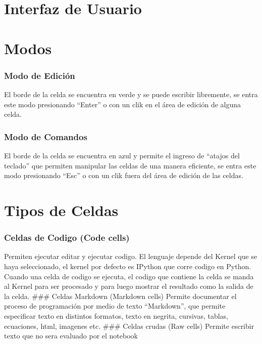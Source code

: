 \documentclass[11pt]{article}
\begin{document}
    \hypertarget{interfaz-de-usuario}{%
\section{Interfaz de Usuario}\label{interfaz-de-usuario}}

    \hypertarget{modos}{%
\section{Modos}\label{modos}}

\hypertarget{modo-de-ediciuxf3n}{%
\subsubsection{Modo de Edición}\label{modo-de-ediciuxf3n}}

El borde de la celda se encuentra en verde y se puede escribir
libremente, se entra este modo presionando ``Enter'' o con un clik en el
área de edición de alguna celda.

\hypertarget{modo-de-comandos}{%
\subsubsection{Modo de Comandos}\label{modo-de-comandos}}

El borde de la celda se encuentra en azul y permite el ingreso de
``atajos del teclado'' que permiten manipular las celdas de una manera
eficiente, se entra este modo presionando ``Esc'' o con un clik fuera
del área de edición de las celdas.

    \hypertarget{tipos-de-celdas}{%
\section{Tipos de Celdas}\label{tipos-de-celdas}}

\hypertarget{celdas-de-codigo-code-cells}{%
\subsubsection{Celdas de Codigo (Code
cells)}\label{celdas-de-codigo-code-cells}}

Permiten ejecutar editar y ejecutar codigo. El lenguaje depende del
Kernel que se haya seleccionado, el kernel por defecto es IPython que
corre codigo en Python. Cuando una celda de codigo se ejecuta, el codigo
que contiene la celda se manda al Kernel para ser procesado y para luego
mostrar el resultado como la salida de la celda. \#\#\# Celdas Markdown
(Markdown cells) Permite documentar el proceso de programación por medio
de texto ``Markdown'', que permite especificar texto en distintos
formatos, texto en negrita, cursivas, tablas, ecuaciones, html, imagenes
etc. \#\#\# Celdas crudas (Raw cells) Permite escribir texto que no sera
evaluado por el notebook
\end{document}
